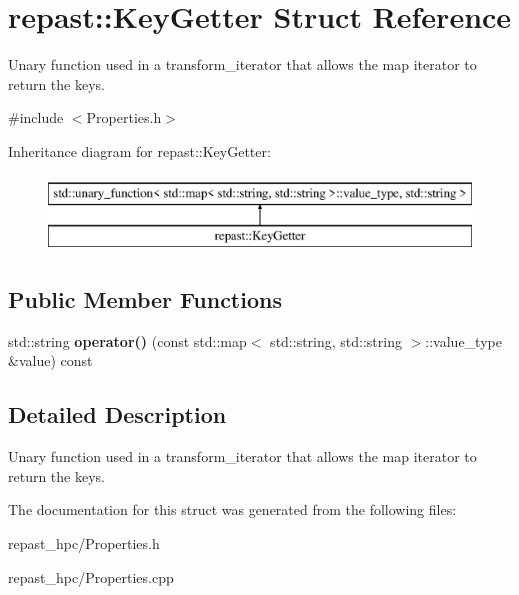 \hypertarget{structrepast_1_1_key_getter}{\section{repast\-:\-:Key\-Getter Struct Reference}
\label{structrepast_1_1_key_getter}
}


Unary function used in a transform\-\_\-iterator that allows the map iterator to return the keys.  




{\ttfamily \#include $<$Properties.\-h$>$}

Inheritance diagram for repast\-:\-:Key\-Getter\-:\begin{figure}[H]
\begin{center}
\leavevmode
\includegraphics[height=2.000000cm]{structrepast_1_1_key_getter}
\end{center}
\end{figure}
\subsection*{Public Member Functions}
\begin{DoxyCompactItemize}
\item 
\hypertarget{structrepast_1_1_key_getter_a8e4c794acce2375ef4e3015443b9a496}{std\-::string {\bfseries operator()} (const std\-::map$<$ std\-::string, std\-::string $>$\-::value\-\_\-type \&value) const }\label{structrepast_1_1_key_getter_a8e4c794acce2375ef4e3015443b9a496}

\end{DoxyCompactItemize}


\subsection{Detailed Description}
Unary function used in a transform\-\_\-iterator that allows the map iterator to return the keys. 

The documentation for this struct was generated from the following files\-:\begin{DoxyCompactItemize}
\item 
repast\-\_\-hpc/Properties.\-h\item 
repast\-\_\-hpc/Properties.\-cpp\end{DoxyCompactItemize}
